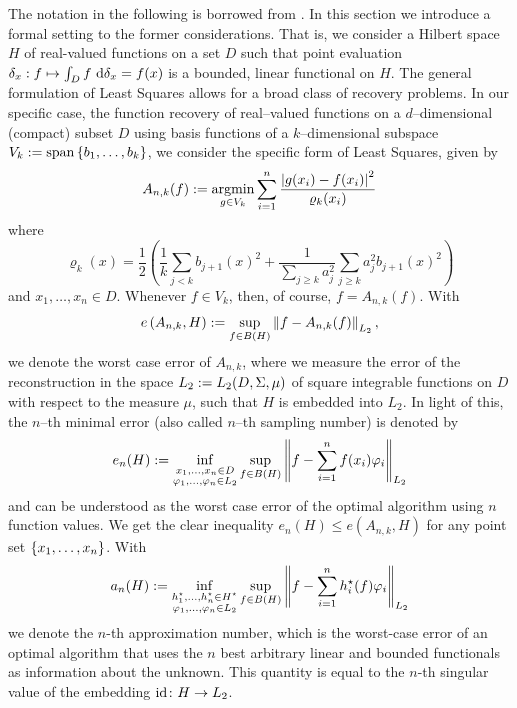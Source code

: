 \documentclass[12pt, oneside]{amsart}
\theoremstyle{definition}
\theoremstyle{remark}
\numberwithin{equation}{section}
\begin{document}
The notation in the following is borrowed from \cite{Ullrich_2020}.
In this section we introduce a formal setting to the former considerations. 
That is, we consider a Hilbert space \(H\) of real-valued functions on a set 
\(D\) such that point evaluation \(\delta_x: f \mapsto \int_D f\ \d \delta_x = 
f(x)\)
is a bounded, linear functional on \(H\).
The general formulation of Least Squares allows for a broad class of recovery 
problems. In our specific case, the function recovery of real--valued functions 
on a \(d\)--dimensional (compact) subset \(D\) using basis functions of a 
\(k\)--dimensional subspace \(V_k \defn \spn \set{b_1, \dots, b_k}\), we 
consider the specific form of Least Squares, given by\[
A_{n, k}(f) \defn \argmin_{g \in V_k} \sum_{i=1}^n \frac{\abs{g(x_i) - 
f(x_i)}^2}{\varrho_k(x_i)}
\]
where \[
\varrho_k(x) = \frac{1}{2} \left( \frac{1}{k} \sum_{j < k} b_{j+1}(x)^2 + 
\frac{1}{\sum_{j \geq k} a_j^2} \sum_{j \geq k} a_j^2 b_{j+1}(x)^2 \right)
\]
and \(x_1, \dots, x_n \in D\). Whenever \(f \in V_k\), then, of course, \(f = 
A_{n, k}(f)\). With
\begin{equation}\label{eq:worstCaseError}
	e\left(A_{n,k}, H\right) \defn \sup_{f \in B(H)} \norm[L_2]{f - A_{n,k}(f)},
\end{equation}
we denote the worst case error of \(A_{n,k}\), where we measure the error of 
the reconstruction in the space \(L_2 \defn L_2(D, \Sigma, \mu)\) of square 
integrable functions on \(D\) with respect to the measure \(\mu\), such that 
\(H\) is embedded into \(L_2\). In light of this, the \(n\)--th minimal error 
(also called \(n\)--th sampling number) is denoted by \[
e_n(H) \defn \inf_{\substack{x_1, \dots, x_n \in D \\ \phi_1, \dots, \phi_n 
		\in L_2}} \sup_{f \in B(H)} \norm[L_2]{f - \sum_{i=1}^n f(x_i) \phi_i}
\]
and can be understood as the worst case error of the optimal algorithm using 
\(n\) function values. We get the clear inequality \(e_n(H) \leq e(A_{n,k}, 
H)\) for any point set \(\set{x_1, \dots, x_n}\). With \[
a_n(H) \defn \inf_{\substack{h_1^\star, \dots, h_n^\star \in H^\star \\ 
		\phi_1, \dots, \phi_n \in L_2}} \sup_{f \in B(H)} \norm[L_2]{f - 
	\sum_{i=1}^n h_i^\star(f) \phi_i}
\]
we denote the \(n\)-th approximation number, which is the worst-case error of 
an optimal algorithm that uses the \(n\) best arbitrary linear and bounded 
functionals as information about the unknown. This quantity is equal to the 
\(n\)-th singular value of the embedding \(\id\from H \to L_2\).
\end{document}
